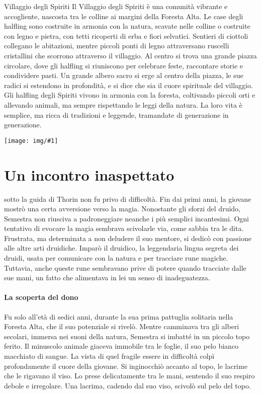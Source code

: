 \documentclass[letterpaper,twocolumn,openany,nodeprecatedcode]{dndbook}
\newcommand{\Cap}[2]{\DndDropCapLine{#1}{#2}}
\newcommand{\imageFull}[3]{%
  \begin{figure*}[#3]
    \begin{tcolorbox}[
        enhanced,
        colframe=PhbTan,
        colback=white,
        opacityback=0,
        title={\vspace{0.2cm}\centering \sc  \textbf{#2}\vspace{0.2cm}},
        colbacktitle=PhbTan!50!PhbLightCyan,
        coltitle=black,
        fonttitle=\bfseries
    ]
    \texttt{[image: img/\#1]}
    \end{tcolorbox}
  \end{figure*}
}
\begin{document}
\begin{DndComment}{Villaggio degli Spiriti}
  \justifying
Il Villaggio degli Spiriti è una comunità vibrante e accogliente, nascosta tra le colline ai margini della Foresta Alta. Le case degli halfling sono costruite in armonia con la natura, scavate nelle colline o costruite con legno e pietra, con tetti ricoperti di erba e fiori selvatici. Sentieri di ciottoli collegano le abitazioni, mentre piccoli ponti di legno attraversano ruscelli cristallini che scorrono attraverso il villaggio. Al centro si trova una grande piazza circolare, dove gli halfling si riuniscono per celebrare feste, raccontare storie e condividere pasti. Un grande albero sacro si erge al centro della piazza, le sue radici si estendono in profondità, e si dice che sia il cuore spirituale del villaggio. Gli halfling degli Spiriti vivono in armonia con la foresta, coltivando piccoli orti e allevando animali, ma sempre rispettando le leggi della natura. La loro vita è semplice, ma ricca di tradizioni e leggende, tramandate di generazione in generazione.
\end{DndComment}
\endgroup

\imageFull{fearun_map.jpg}{Mappa del Faer\"un}{ht}


\section{Un incontro inaspettato}

\Cap{L}{’addestramento di Semestra} sotto la guida di Thorin non fu privo di difficoltà. Fin dai primi anni, la giovane mostrò una certa avversione verso la magia. Nonostante gli sforzi del druido, Semestra non riusciva a padroneggiare neanche i più semplici incantesimi. Ogni tentativo di evocare la magia sembrava scivolarle via, come sabbia tra le dita. Frustrata, ma determinata a non deludere il suo mentore, si dedicò con passione alle altre arti druidiche. Imparò il druidico, la leggendaria lingua segreta dei druidi, usata per comunicare con la natura e per tracciare rune magiche. Tuttavia, anche queste rune sembravano prive di potere quando tracciate dalle sue mani, un fatto che alimentava in lei un senso di inadeguatezza.

\paragraph{La scoperta del dono}  
Fu solo all’età di sedici anni, durante la sua prima pattuglia solitaria nella Foresta Alta, che il suo potenziale si rivelò. Mentre camminava tra gli alberi secolari, immersa nei suoni della natura, Semestra si imbatté in un piccolo topo ferito. Il minuscolo animale giaceva immobile tra le foglie, il suo pelo bianco macchiato di sangue. La vista di quel fragile essere in difficoltà colpì profondamente il cuore della giovane. Si inginocchiò accanto al topo, le lacrime che le rigavano il viso. Lo prese delicatamente tra le mani, sentendo il suo respiro debole e irregolare. Una lacrima, cadendo dal suo viso, scivolò sul pelo del topo.
\end{document}
